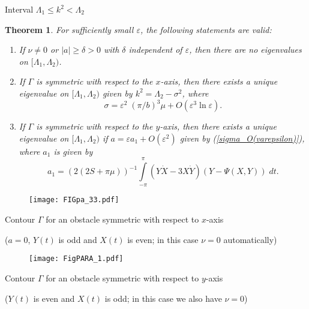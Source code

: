 \documentclass{beamer}
\newtheorem{teo}{Theorem}[section]
\newcommand{\ds}{\displaystyle}
\begin{document}
\begin{frame}{Interval $\Lambda_1\leq k^2<\Lambda_2$}
\begin{teo}\label{a^{ast}+}
For sufficiently small $\varepsilon$, the following statements are valid:
\begin{enumerate}
\item[(i)] If $\nu\neq0$ or $|a|\geq\delta>0$ with $\delta$ independent of $\varepsilon$, then there are no eigenvalues on $[\Lambda_1,\Lambda_2)$.
\item[(ii)] If $\Gamma$ is symmetric with respect to the $x$-axis, then there exists a unique eigenvalue on $[\Lambda_1,\Lambda_2)$ given by $k^2=\Lambda_2-\sigma^2$, where
\begin{equation}\label{sigma_O(varepsilon)}
\sigma=\varepsilon^2\;\ds{(\pi/b)^3} \mu+O(\varepsilon^3\ln\varepsilon).
\end{equation}
\item[(iii)] If $\Gamma$ is symmetric with respect to the $y$-axis, then there exists a unique eigenvalue on $[\Lambda_1,\Lambda_2)$ if $a=\varepsilon a_1+O(\varepsilon^2)$ given by  (\ref{sigma_O(varepsilon)}), where $a_1$ is given by 
\begin{equation}\label{fa1}
a_1=\textstyle(2(2S+\pi\mu))^{-1}\textstyle\int\limits_{-\pi}^{\pi} (Y\dot{X}-3X\dot{Y}) \left(Y-\Psi(X,Y)\right)\;dt.
\end{equation}  
\end{enumerate}
\end{teo}
\end{frame}

\begin{frame}


\begin{figure}[htbp]
\centering
\texttt{[image: FIGpa\_33.pdf]}
\end{figure}
\centerline{Contour $\Gamma$ for an obstacle symmetric with respect to $x$-axis} 
\centerline{($a=0$, $Y(t)$ is odd and $X(t)$ is even; in this case $\nu=0$ automatically)}
\end{frame}
\begin{frame}
\begin{figure}[htbp]
\centering
\texttt{[image: FigPARA\_1.pdf]}
\end{figure}
\centerline{Contour $\Gamma$ for an obstacle symmetric with respect to $y$-axis} 
\centerline{($Y(t)$ is even and $X(t)$ is odd; in this case we also have $\nu=0$)}
\end{frame}
\end{document}

